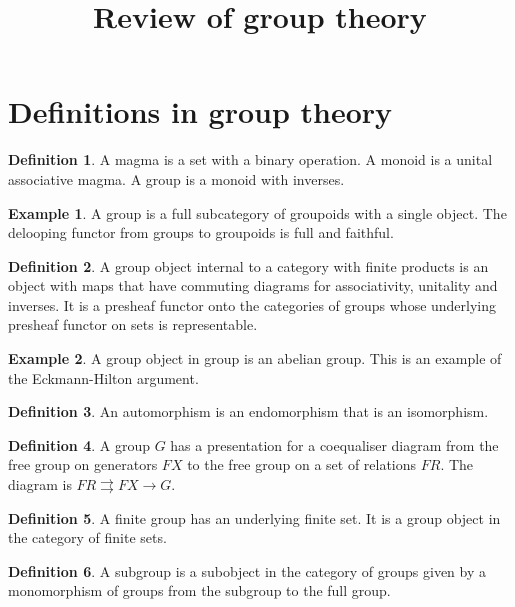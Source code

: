 \documentclass[10pt]{article}
\theoremstyle{plain}%
\theoremstyle{definition}
\newtheorem{definition}{Definition}[section]
\newtheorem{example}{Example}[section]
\theoremstyle{remark}
\begin{document}
\title{Review of group theory}

\maketitle

\section{Definitions in group theory}

\begin{definition}
	A magma is a set with a binary operation.
	A monoid is a unital associative magma.
	A group is a monoid with inverses.
\end{definition}

\begin{example}
	A group is a full subcategory of groupoids with a single object. The delooping functor from groups to groupoids is full and faithful.
\end{example}

\begin{definition}
	A group object internal to a category with finite products is an object with maps that have commuting diagrams for associativity, unitality and inverses. It is a presheaf functor onto the categories of groups whose underlying presheaf functor on sets is representable.
\end{definition}

\begin{example}
	A group object in group is an abelian group. This is an example of the Eckmann-Hilton argument.
\end{example}

\begin{definition}
	An automorphism is an endomorphism that is an isomorphism.
\end{definition}

\begin{definition}
	A group $G$ has a presentation for a coequaliser diagram from the free group on generators $FX$ to the free group on a set of relations $FR$.
	The diagram is $FR \rightrightarrows FX \rightarrow G$.
\end{definition}

\begin{definition}
	A finite group has an underlying finite set. It is a group object in the category of finite sets.
\end{definition}

\begin{definition}
	A subgroup is a subobject in the category of groups given by a monomorphism of groups from the subgroup to the full group.
\end{definition}
\end{document}
